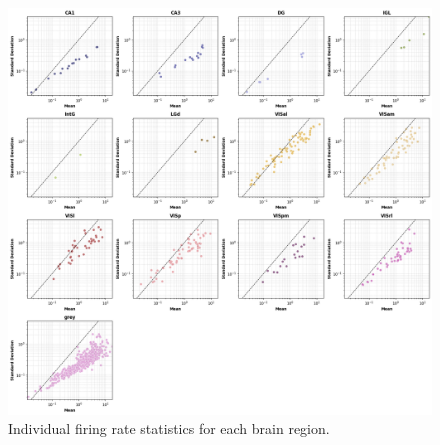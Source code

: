 \documentclass[10pt,twocolumn]{article}
\begin{document}
\begin{figure}[H]
\centering
\includegraphics[width=\linewidth]{report_images/unit_firing_rate_statistics_single.png}
\caption{Individual firing rate statistics for each brain region.}
\label{fig:firing_rate_single}
\end{figure}
\end{document}
